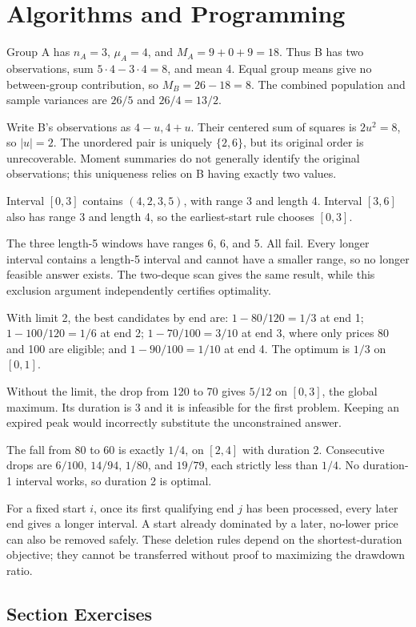 \section{Algorithms and Programming}

Group A has $n_A=3$, $\mu_A=4$, and $M_A=9+0+9=18$. Thus B has two observations, sum $5\cdot4-3\cdot4=8$, and mean 4. Equal group means give no between-group contribution, so $M_B=26-18=8$. The combined population and sample variances are $26/5$ and $26/4=13/2$.

Write B's observations as $4-u,4+u$. Their centered sum of squares is $2u^2=8$, so $|u|=2$. The unordered pair is uniquely $\{2,6\}$, but its original order is unrecoverable. Moment summaries do not generally identify the original observations; this uniqueness relies on B having exactly two values.

Interval $[0,3]$ contains $(4,2,3,5)$, with range 3 and length 4. Interval $[3,6]$ also has range 3 and length 4, so the earliest-start rule chooses $[0,3]$.

The three length-5 windows have ranges 6, 6, and 5. All fail. Every longer interval contains a length-5 interval and cannot have a smaller range, so no longer feasible answer exists. The two-deque scan gives the same result, while this exclusion argument independently certifies optimality.

With limit 2, the best candidates by end are: $1-80/120=1/3$ at end 1; $1-100/120=1/6$ at end 2; $1-70/100=3/10$ at end 3, where only prices 80 and 100 are eligible; and $1-90/100=1/10$ at end 4. The optimum is $1/3$ on $[0,1]$.

Without the limit, the drop from 120 to 70 gives $5/12$ on $[0,3]$, the global maximum. Its duration is 3 and it is infeasible for the first problem. Keeping an expired peak would incorrectly substitute the unconstrained answer.

The fall from 80 to 60 is exactly $1/4$, on $[2,4]$ with duration 2. Consecutive drops are $6/100$, $14/94$, $1/80$, and $19/79$, each strictly less than $1/4$. No duration-1 interval works, so duration 2 is optimal.

For a fixed start $i$, once its first qualifying end $j$ has been processed, every later end gives a longer interval. A start already dominated by a later, no-lower price can also be removed safely. These deletion rules depend on the shortest-duration objective; they cannot be transferred without proof to maximizing the drawdown ratio.

\par{}
\subsection*{Section Exercises}



